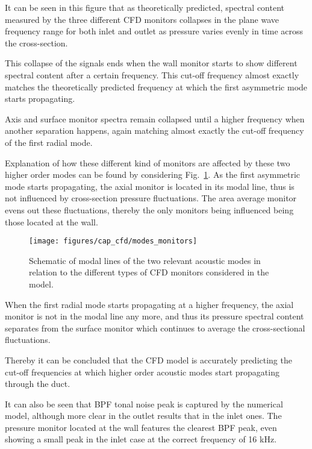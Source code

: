 It can be seen in this figure that as theoretically predicted,  spectral content measured by the three different CFD monitors collapses in the plane wave frequency range for both inlet and outlet as pressure varies evenly in time across the cross-section.

This collapse of the signals ends when the wall monitor starts to show different spectral content after a certain frequency. This cut-off frequency almost exactly matches the theoretically predicted frequency at which the first asymmetric mode starts propagating.

Axis and surface monitor spectra remain collapsed until a higher frequency when another separation happens, again matching almost exactly the cut-off frequency of the first radial mode.

Explanation of how these different kind of monitors are affected by these two higher order modes can be found by considering Fig.~\ref{fig:cfd_modes_monitors}. As the first asymmetric mode starts propagating, the axial monitor is located in its modal line, thus is not influenced by cross-section pressure fluctuations. The area average monitor evens out these fluctuations, thereby the only monitors being influenced being those located at the wall.

\begin{figure}[htb!]
\centering
\texttt{[image: figures/cap\_cfd/modes\_monitors]}
\caption[Schematic of acoustic modes modal lines]{Schematic of modal lines of the two relevant acoustic modes in relation to the different types of CFD monitors considered in the model.}
\label{fig:cfd_modes_monitors}
\end{figure}

When the first radial mode starts propagating at a higher frequency, the axial monitor is not in the modal line any more, and thus its pressure spectral content separates from the surface monitor which continues to average the cross-sectional fluctuations.

Thereby it can be concluded that the CFD model is accurately predicting the cut-off frequencies at which higher order acoustic modes start propagating through the duct.

It can also be seen that BPF tonal noise peak is captured by the numerical model, although more clear in the outlet results that in the inlet ones. The pressure monitor located at the wall features the clearest BPF peak, even showing a small peak in the inlet case at the correct frequency of 16 kHz.

